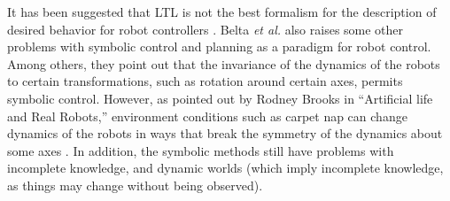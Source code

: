 %	
%			
It has been suggested that LTL is not the best formalism for the description of desired behavior for robot controllers \citep{belta2007symbolic}.
Belta \emph{et al.} also raises some other problems with symbolic control and planning as a paradigm for robot control. 
Among others, they point out that the invariance of the dynamics of the robots to certain transformations, such as rotation around certain axes, permits symbolic control. 
However, as pointed out by Rodney Brooks in ``Artificial life and Real Robots,'' environment conditions such as carpet nap can change dynamics of the robots in ways that break the symmetry of the dynamics about some axes \citep{brooks1992artificial}.
In addition, the symbolic methods still have problems with incomplete knowledge, and dynamic worlds (which imply incomplete knowledge, as things may change without being observed). 
